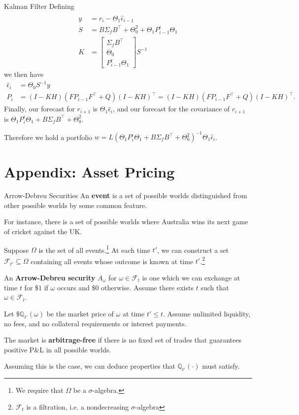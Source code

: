 \documentclass{beamer}
\begin{document}
\begin{frame}{Kalman Filter}
	Defining
	\begin{align*}
	\\	y				&= r_i - \Theta_1 \hat{\epsilon}_{i-1}
	\\	S				&= B\Sigma_f B^\top + \Theta_0^2 + \Theta_1 P^\epsilon_{i-1}\Theta_1
	\\	K				&= \left[\begin{matrix}\Sigma_f B^\top \\ \Theta_0 \\ P^\epsilon_{i-1} \Theta_1 \end{matrix}\right] S^{-1} 
	\end{align*}
	we then have
	\begin{align*}
		\hat{\epsilon}_i&= \Theta_0 S^{-1} y
	\\	P_i		&= (I-KH) (F P_{i-1} F^\top + Q) (I-KH)^\top = (I-KH) (F P_{i-1} F^\top + Q) (I-KH)^\top.
	\end{align*}
	Finally, our forecast for $r_{i+1}$ is $\Theta_1\hat{\epsilon}_i$, and our forecast for the covariance of $r_{i+1}$ is $\Theta_1 P^\epsilon_i \Theta_1 + B\Sigma_f B^\top+\Theta_0^2$.

	Therefore we hold a portfolio $w = L(\Theta_1 P^\epsilon_i \Theta_1 + B\Sigma_f B^\top + \Theta_0^2)^{-1} \Theta_1\hat{\epsilon}_i$.
\end{frame}

\section{Appendix: Asset Pricing}
\begin{frame}{Arrow-Debreu Securities}
	An \textbf{event} is a set of possible worlds distinguished from other possible worlds by some common feature.

	For instance, there is a set of possible worlds where Australia wins its next game of cricket against the UK.%

	Suppose $\Omega$ is the set of all events.\footnote{We require that $\Omega$ be a $\sigma$-algebra.} At each time $t'$, we can construct a set $\mathcal{F}_{t'}\subseteq \Omega$ containing all events whose outcome is known at time $t'$.\footnote{$\mathcal{F}_t$ is a filtration, i.e. a nondecreasing $\sigma$-algebra}

	An \textbf{Arrow-Debreu security} $A_\omega$ for $\omega\in \mathcal{F}_t$ is one which we can exchange at time $t$ for $\$1$ if $\omega$ occurs and $\$0$ otherwise. Assume there exists $t$ such that $\omega\in\mathcal{F}_t$.

	Let $\$\mathbb{Q}_{t'}(\omega)$ be the market price of $\omega$ at time $t'\leq t$. Assume unlimited liquidity, no fees, and no collateral requirements or interest payments.

	The market is \textbf{arbitrage-free} if there is no fixed set of trades that guarantees positive P\&L in all possible worlds.

	Assuming this is the case, we can deduce properties that $\mathbb{Q}_{t'}(\cdot)$ must satisfy.
\end{frame}
\end{document}
